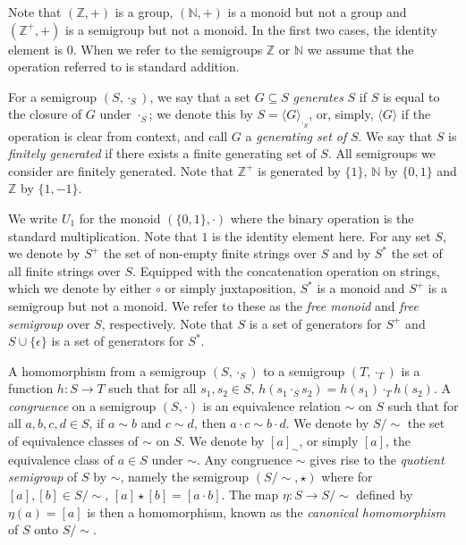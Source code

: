 \documentclass[a4paper,UKenglish,cleveref, autoref, thm-restate, anonymous]{lipics-v2021}
\begin{document}

Note that $(\mathbb{Z},+)$ is a group, $(\mathbb{N},+)$ is a monoid but not a group and $(\mathbb{Z}^+,+)$ is a semigroup but not a monoid.  In the first two cases, the identity element is $0$.  When we refer to the semigroups $\mathbb{Z}$ or $\mathbb{N}$ we assume that the operation referred to is standard addition.

For a semigroup $(S, \cdot_S)$, we say that a set $G \subseteq S$ \emph{generates} $S$ if $S$ is equal to the closure of $G$ under $\cdot_S$; we denote this by $S = \langle G \rangle_{\cdot_S}$, or, simply, $\langle G \rangle$ if the operation is clear from context, and call $G$ a \emph{generating set of} $S$. We say that $S$ is \emph{finitely generated} if there exists a finite generating set of $S$.  All semigroups we consider are finitely generated.  Note that $\mathbb{Z}^+$ is generated by $\{1\}$, $\mathbb{N}$ by $\{0,1\}$ and $\mathbb{Z}$ by $\{1,-1\}$.

We write $U_1$ for the monoid $(\{0,1\},\cdot)$ where the binary operation is the standard multiplication.  Note that $1$ is the identity element here.
For any set $S$, we denote by $S^+$ the set of non-empty finite strings over $S$ and by $S^*$ the set of all finite strings over $S$.  Equipped with the concatenation operation on strings, which we denote by either $\circ$ or simply juxtaposition, $S^*$ is a monoid and $S^+$ is a semigroup but not a monoid.  We refer to these as the \emph{free monoid} and \emph{free semigroup} over $S$, respectively.  Note that $S$ is a set of generators for $S^+$ and $S \cup \{\epsilon\}$ is a set of generators for $S^*$.

A homomorphism from a semigroup $(S, \cdot_S)$ to a semigroup $(T, \cdot_T)$ is a function $h : S \rightarrow T$ such that for all $s_1, s_2 \in S$, $h(s_1 \cdot_S s_2) = h(s_1) \cdot_T h(s_2)$.     A \emph{congruence} on a semigroup $(S, \cdot)$ is an equivalence relation $\sim$ on $S$ such that for all $a,b,c,d \in S$, if $a \sim b$ and $c \sim d$, then $a \cdot c \sim b \cdot d$.  We denote by $S/{\sim}$ the set of equivalence classes of $\sim$ on $S$.  We denote by $[a]_{\sim}$, or simply $[a]$, the equivalence class of $a \in S$ under $\sim$.  Any congruence $\sim$ gives rise to the \emph{quotient semigroup} of $S$ by $\sim$, namely the semigroup $(S/{\sim}, \star)$ where for $[a],[b] \in S/{\sim}$, $[a] \star [b] = [a \cdot b]$.  The map $\eta : S \rightarrow S/{\sim}$ defined by $\eta(a) = [a]$ is then a homomorphism, known as the  \emph{canonical homomorphism} of $S$ onto $S/{\sim}$.
\end{document}
